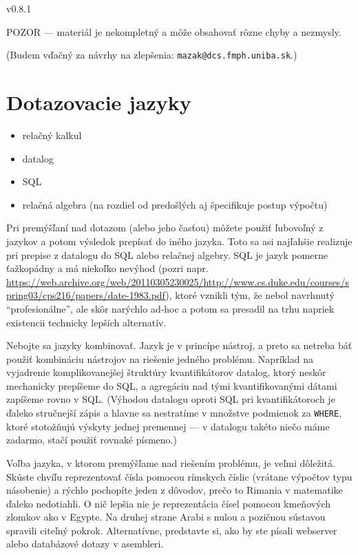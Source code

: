 \documentclass[10pt, a4paper]{article}
\theoremstyle{definition}
\begin{document}
\pagestyle{empty}

v0.8.1

POZOR --- materiál je nekompletný a môže obsahovať rôzne chyby a nezmysly.

(Budem vďačný za návrhy na zlepšenia: {\tt mazak@dcs.fmph.uniba.sk}.)

\section{Dotazovacie jazyky}

\begin{itemize}
\item relačný kalkul
\item datalog
\item SQL
\item relačná algebra (na rozdiel od predošlých aj špecifikuje postup výpočtu)
\end{itemize}

Pri premýšľaní nad dotazom (alebo jeho časťou) môžete použiť ľubovoľný z jazykov a potom výsledok prepísať do iného jazyka. Toto sa asi najľahšie realizuje pri prepise z datalogu do SQL alebo relačnej algebry. SQL je jazyk pomerne ťažkopádny a má niekoľko nevýhod (pozri napr. \url{https://web.archive.org/web/20110305230025/http://www.cs.duke.edu/courses/spring03/cps216/papers/date-1983.pdf}), ktoré vznikli tým, že nebol navrhnutý \enquote{profesionálne}, ale skôr narýchlo ad-hoc a potom sa presadil na trhu napriek existencii technicky lepších alternatív.

Nebojte sa jazyky kombinovať. Jazyk je v princípe nástroj, a preto sa netreba báť použiť kombináciu nástrojov na riešenie jedného problému. Napríklad na vyjadrenie komplikovanejšej štruktúry kvantifikátorov datalog, ktorý neskôr mechanicky prepíšeme do SQL, a agregáciu nad tými kvantifikovanými dátami zapíšeme rovno v SQL. (Výhodou datalogu oproti SQL pri kvantifikátoroch je ďaleko stručnejší zápis a hlavne sa nestratíme v množstve podmienok za \verb|WHERE|, ktoré stotožňujú výskyty jednej premennej --- v datalogu takéto niečo máme zadarmo, stačí použiť rovnaké písmeno.)

Voľba jazyka, v ktorom premýšľame nad riešením problému, je veľmi dôležitá. Skúste chvíľu reprezentovať čísla pomocou rímskych číslic (vrátane výpočtov typu násobenie) a rýchlo pochopíte jeden z dôvodov, prečo to Rimania v matematike ďaleko nedotiahli. O nič lepšia nie je reprezentácia čísel pomocou kmeňových zlomkov ako v Egypte. Na druhej strane Arabi s nulou a pozičnou sústavou spravili citeľný pokrok. Alternatívne, predstavte si, ako by ste písali webserver alebo databázové dotazy v asembleri.
\end{document}
